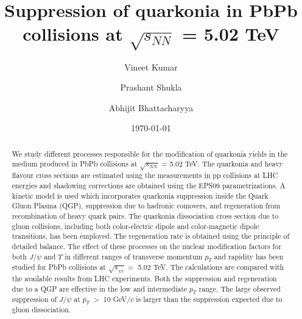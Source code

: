 \documentclass[12pt,a4paper,final]{iopart} %
\newcommand{\Jpsi}{J/\psi}
\newcommand{\pT}{p_{T}}
\newcommand{\sNN}{\sqrt{s_{_{NN}}}}
\begin{document}
\title[]{Suppression of quarkonia in PbPb collisions at $\sqrt{s_{NN}}$ =  5.02 TeV}
\author{Vineet Kumar}
\address{Nuclear Physics Division, Bhabha Atomic Research Center, Mumbai, India}
\address{Department of Physics, University Of Illinois, Chicago, USA}
\author{Prashant Shukla}
\address{Nuclear Physics Division, Bhabha Atomic Research Center, Mumbai, India}
\address{Homi Bhabha National Institute, Anushakti Nagar, Mumbai, India}
\author{Abhijit Bhattacharyya}
\address{Department of Physics, University of Calcutta, 92, A. P. C. Road Kolkata-700009, India}


\date{\today}

\begin{abstract}
  
  We study different processes responsible for the modification of quarkonia yields
in the medium produced in PbPb collisions at $\sqrt{s_{NN}}$ =  5.02 TeV.
The quarkonia and heavy flavour cross sections are estimated using the measurements in
pp collisions at LHC energies and shadowing corrections are obtained using the EPS09
parametrizations. A kinetic model is used which incorporates quarkonia suppression
inside the Quark Gluon Plasma (QGP), suppression due to hadronic comovers, and regeneration
from recombination of heavy quark pairs. The quarkonia dissociation cross section due to gluon 
collisions, including both color-electric dipole and color-magnetic dipole transitions,
has been employed. The regeneration rate is obtained using the principle of 
detailed balance. The effect of these processes on the nuclear modification
factors for both $\Jpsi$ and $\Upsilon$ in different ranges of transverse momentum
$\pT$ and rapidity has been studied for PbPb collisions at $\sNN =$ 5.02 TeV. The calculations
are compared with the available results from LHC experiments. Both the suppression
and regeneration due to a QGP are effective in the low and intermediate $\pT$ range.
The large observed suppression of $\Jpsi$ at
$\pT~>$ 10 GeV/$c$ is larger than the suppression expected due to gluon dissociation.

\end{abstract}


\maketitle
\end{document}

